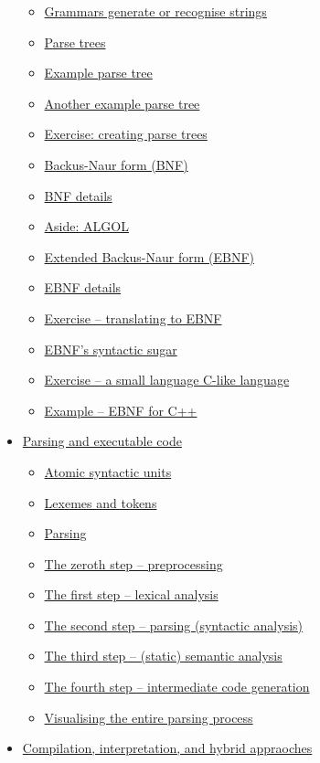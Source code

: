 \documentclass[11pt]{article}
\theoremstyle{definition}
\begin{document}
\begin{scriptsize}
\begin{itemize}
\begin{itemize}
\item \hyperref[sec:org82cf952]{Grammars generate or recognise strings}
\item \hyperref[sec:org79b8bae]{Parse trees}
\item \hyperref[sec:org691da27]{Example parse tree}
\item \hyperref[sec:org5b83cf4]{Another example parse tree}
\item \hyperref[sec:org3c97218]{Exercise: creating parse trees}
\item \hyperref[sec:orge898696]{Backus-Naur form (BNF)}
\item \hyperref[sec:org73d6b60]{BNF details}
\item \hyperref[sec:org6388b34]{Aside: ALGOL}
\item \hyperref[sec:org44cd41d]{Extended Backus-Naur form (EBNF)}
\item \hyperref[sec:org91db6d9]{EBNF details}
\item \hyperref[sec:org6e7cf47]{Exercise – translating to EBNF}
\item \hyperref[sec:org95bf709]{EBNF's syntactic sugar}
\item \hyperref[sec:org84c6c90]{Exercise – a small language C-like language}
\item \hyperref[sec:org769cdf0]{Example – EBNF for C++}
\end{itemize}
\item \hyperref[sec:org1f7a6b7]{Parsing and executable code}
\begin{itemize}
\item \hyperref[sec:orgf631fa0]{Atomic syntactic units}
\item \hyperref[sec:org06d40a8]{Lexemes and tokens}
\item \hyperref[sec:org8c9badf]{Parsing}
\item \hyperref[sec:org20ad543]{The zeroth step – preprocessing}
\item \hyperref[sec:org566a16a]{The first step – lexical analysis}
\item \hyperref[sec:org1db1ff2]{The second step – parsing (syntactic analysis)}
\item \hyperref[sec:orgc9121d5]{The third step – (static) semantic analysis}
\item \hyperref[sec:orgba3ffcd]{The fourth step – intermediate code generation}
\item \hyperref[sec:org8c0506c]{Visualising the entire parsing process}
\end{itemize}
\item \hyperref[sec:org05f6599]{Compilation, interpretation, and hybrid appraoches}

\end{itemize}
\end{scriptsize}
\end{document}
